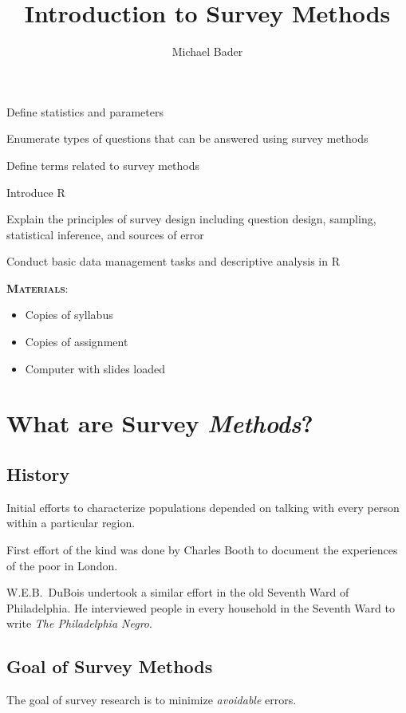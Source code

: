 \documentclass[11pt]{lecturenotes}
\title{Introduction to Survey Methods}
\author{Michael Bader}
\begin{document}
\maketitle

\begin{objectives}{
\item Define statistics and parameters
\item Enumerate types of questions that can be answered using survey methods
\item Define terms related to survey methods
\item Introduce R}{
\item Explain the principles of survey design including question design, sampling, statistical inference, and sources of error
\item Conduct basic data management tasks and descriptive analysis in R
}
\end{objectives}

\vspace{1em}
\textbf{\textsc{Materials}}: \vspace{-\baselineskip}
\begin{itemize}
\item Copies of syllabus 
\item Copies of assignment
\item Computer with slides loaded
\end{itemize}


\section{What are Survey \emph{Methods}?}
\subsection[5]{History}
Initial efforts to characterize populations depended on talking with every person within a particular region. 

\slide
First effort of the kind was done by Charles Booth to document the experiences of the poor in London. 

\slide
W.E.B.\ DuBois undertook a similar effort in the old Seventh Ward of Philadelphia. He interviewed people in every household in the Seventh Ward to write \emph{The Philadelphia Negro}.

\subsection[5]{Goal of Survey Methods}
\slide
The goal of survey research is to minimize \emph{avoidable} errors. 
\end{document}
